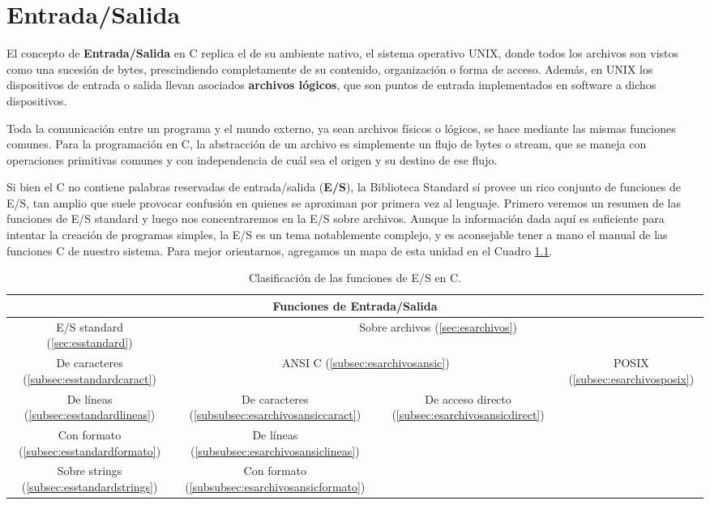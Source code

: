 


\chapter{Entrada/Salida}

El concepto de \textbf{Entrada/Salida} en C replica el de su ambiente nativo, el sistema
operativo UNIX, donde todos los archivos son vistos como una sucesión de bytes,
prescindiendo completamente de su contenido, organización o forma de acceso.
Además, en UNIX los dispositivos de entrada o salida llevan asociados \textbf{archivos
lógicos}, que son puntos de entrada implementados en software a dichos
dispositivos. 

Toda la comunicación entre un programa y el mundo externo, ya
sean archivos físicos o lógicos, se hace mediante las mismas funciones comunes.
Para la programación en C, la abstracción de un
archivo es simplemente un flujo de bytes o stream, que se maneja con
operaciones primitivas comunes y con independencia de cuál sea el origen y su destino de ese flujo.

Si bien el C no contiene palabras reservadas de entrada/salida (\textbf{E/S}), la
Biblioteca Standard sí provee un rico conjunto de funciones de E/S, tan amplio
que suele provocar confusión en quienes se aproximan por primera vez al
lenguaje. Primero veremos un resumen de las funciones de E/S standard
y luego nos concentraremos en la E/S sobre archivos. Aunque la información dada
aquí es suficiente para intentar la creación de programas simples, la E/S es un
tema notablemente complejo, y es aconsejable tener a mano el manual de las
funciones C de nuestro sistema. Para mejor orientarnos, agregamos un mapa de esta unidad en el Cuadro \ref{tab:mapaes}.


\begin{table}[htbp]
\centering
\begin{tabular}{|c|c|c|c|}
\hline
\multicolumn{4}{|c|}{Funciones de Entrada/Salida}\\
\hline
		E/S standard (\ref{sec:esstandard})& \multicolumn{3}{c|}{Sobre archivos (\ref{sec:esarchivos})}\\
		\hline
		De caracteres (\ref{subsec:esstandardcaract})& \multicolumn{2}{c|}{ANSI C (\ref{subsec:esarchivosansic})}  & POSIX (\ref{subsec:esarchivosposix})\\\cline{2-4}
		De líneas (\ref{subsec:esstandardlineas})& De caracteres (\ref{subsubsec:esarchivosansiccaract})& De acceso directo (\ref{subsec:esarchivosansicdirect})& \\
		Con formato (\ref{subsec:esstandardformato})& De líneas (\ref{subsubsec:esarchivosansiclineas})& & \\
		Sobre strings (\ref{subsec:esstandardstrings})& Con formato (\ref{subsubsec:esarchivosansicformato})& & \\
\hline
\end{tabular}
\caption{Clasificación de las funciones de E/S en C.}
\label{tab:mapaes}
\end{table}


